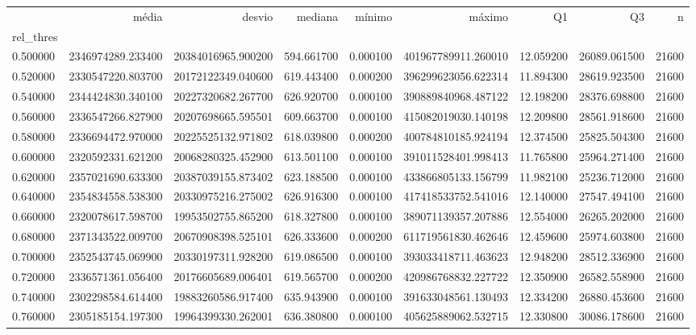 \begin{tabular}{lrrrrrrrr}
\toprule
 & média & desvio & mediana & mínimo & máximo & Q1 & Q3 & n \\
rel_thres &  &  &  &  &  &  &  &  \\
\midrule
0.500000 & 2346974289.233400 & 20384016965.900200 & 594.661700 & 0.000100 & 401967789911.260010 & 12.059200 & 26089.061500 & 21600 \\
0.520000 & 2330547220.803700 & 20172122349.040600 & 619.443400 & 0.000200 & 396299623056.622314 & 11.894300 & 28619.923500 & 21600 \\
0.540000 & 2344424830.340100 & 20227320682.267700 & 626.920700 & 0.000100 & 390889840968.487122 & 12.198200 & 28376.698800 & 21600 \\
0.560000 & 2336547266.827900 & 20207698665.595501 & 609.663700 & 0.000100 & 415082019030.140198 & 12.209800 & 28561.918600 & 21600 \\
0.580000 & 2336694472.970000 & 20225525132.971802 & 618.039800 & 0.000200 & 400784810185.924194 & 12.374500 & 25825.504300 & 21600 \\
0.600000 & 2320592331.621200 & 20068280325.452900 & 613.501100 & 0.000100 & 391011528401.998413 & 11.765800 & 25964.271400 & 21600 \\
0.620000 & 2357021690.633300 & 20387039155.873402 & 623.188500 & 0.000100 & 433866805133.156799 & 11.982100 & 25236.712000 & 21600 \\
0.640000 & 2354834558.538300 & 20330975216.275002 & 626.916300 & 0.000100 & 417418533752.541016 & 12.140000 & 27547.494100 & 21600 \\
0.660000 & 2320078617.598700 & 19953502755.865200 & 618.327800 & 0.000100 & 389071139357.207886 & 12.554000 & 26265.202000 & 21600 \\
0.680000 & 2371343522.009700 & 20670908398.525101 & 626.333600 & 0.000200 & 611719561830.462646 & 12.459600 & 25974.603800 & 21600 \\
0.700000 & 2352543745.069900 & 20330197311.928200 & 619.086500 & 0.000100 & 393033418711.463623 & 12.948200 & 28512.336900 & 21600 \\
0.720000 & 2336571361.056400 & 20176605689.006401 & 619.565700 & 0.000200 & 420986768832.227722 & 12.350900 & 26582.558900 & 21600 \\
0.740000 & 2302298584.614400 & 19883260586.917400 & 635.943900 & 0.000100 & 391633048561.130493 & 12.334200 & 26880.453600 & 21600 \\
0.760000 & 2305185154.197300 & 19964399330.262001 & 636.380800 & 0.000100 & 405625889062.532715 & 12.330800 & 30086.178600 & 21600 \\

\end{tabular}
